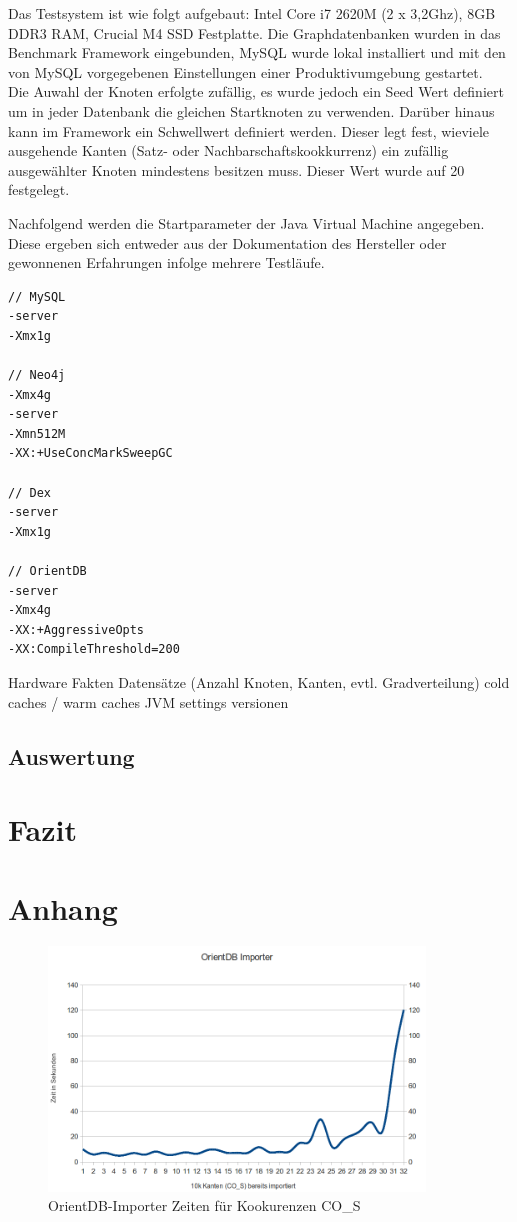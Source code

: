 \documentclass[11pt, a4paper, oneside]{article} %
\begin{document}
Das Testsystem ist wie folgt aufgebaut: Intel Core i7 2620M (2 x 3,2Ghz), 8GB DDR3 RAM, Crucial M4 SSD Festplatte. Die Graphdatenbanken wurden in das Benchmark Framework eingebunden, MySQL wurde lokal installiert und mit den von MySQL vorgegebenen Einstellungen einer Produktivumgebung gestartet.\\
Die Auwahl der Knoten erfolgte zufällig, es wurde jedoch ein Seed Wert definiert um in jeder Datenbank die gleichen Startknoten zu verwenden. Darüber hinaus kann im Framework ein Schwellwert definiert werden. Dieser legt fest, wieviele ausgehende Kanten (Satz- oder Nachbarschaftskookkurrenz) ein zufällig ausgewählter Knoten mindestens besitzen muss. Dieser Wert wurde auf 20 festgelegt.
\par
Nachfolgend werden die Startparameter der Java Virtual Machine angegeben. Diese ergeben sich entweder aus der Dokumentation des Hersteller oder gewonnenen Erfahrungen infolge mehrere Testläufe.

\begin{lstlisting}
// MySQL
-server
-Xmx1g

// Neo4j
-Xmx4g
-server
-Xmn512M
-XX:+UseConcMarkSweepGC

// Dex
-server
-Xmx1g

// OrientDB
-server
-Xmx4g
-XX:+AggressiveOpts 
-XX:CompileThreshold=200
\end{lstlisting}


Hardware Fakten
Datensätze (Anzahl Knoten, Kanten, evtl. Gradverteilung)
cold caches / warm caches
JVM settings
versionen

\subsection{Auswertung}

\section{Fazit}



\newpage
\onecolumn

\section{Anhang}

\begin{figure}[htbp]
	\centering
	\includegraphics[width=10cm]{OrientImporter.png} 
	\caption{OrientDB-Importer Zeiten für Kookurenzen CO\_{}S}
	\label{fig:orientdb_import}
\end{figure}
\end{document}
